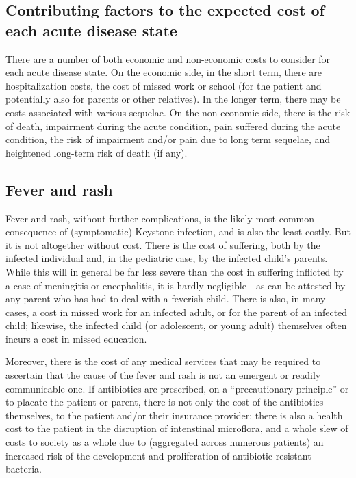 \documentclass[12pt]{article}
\newcommand{\cjh}{\textcolor{blue}{cjh}}
\newcommand{\msg}[3]{(#1 $\rightarrow$ #2: #3)}
\newcommand{\mcc}[1]{\msg\cjh\cjh{#1}}
\begin{document}


        \subsection{Contributing factors to the expected cost of each acute disease state}
            \label{cost-factors}
            There are a number of both economic and non-economic costs to consider for each acute disease state. On the economic side, in the short term, there are hospitalization costs, the cost of missed work or school (for the patient and potentially also for parents or other relatives). In the longer term, there may be costs associated with various sequelae. On the non-economic side, there is the risk of death, impairment during the acute condition, pain suffered during the acute condition, the risk of impairment and/or pain due to long term sequelae, and heightened long-term risk of death (if any).

        \subsection{Fever and rash}
            \label{cost-fever}
            Fever and rash, without further complications, is the likely most common consequence of (symptomatic) Keystone infection, and is also the least costly. But it is not altogether without cost. There is the cost of suffering, both by the infected individual and, in the pediatric case, by the infected child's parents. While this will in general be far less severe than the cost in suffering inflicted by a case of meningitis or encephalitis, it is hardly negligible---as can be attested by any parent who has had to deal with a feverish child. There is also, in many cases, a cost in missed work for an infected adult, or for the parent of an infected child; likewise, the infected child (or adolescent, or young adult) themselves often incurs a cost in missed education.

            Moreover, there is the cost of any medical services that may be required to ascertain that the cause of the fever and rash is not an emergent or readily communicable one. If antibiotics are prescribed, on a ``precautionary principle'' or to placate the patient or parent, there is not only the cost of the antibiotics themselves, to the patient and/or their insurance provider; there is also a health cost to the patient in the disruption of intenstinal microflora, and a whole slew of costs to society as a whole due to (aggregated across numerous patients) an increased risk of the development and proliferation of antibiotic-resistant bacteria.
\end{document}
